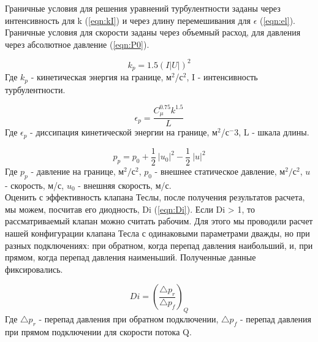 \documentclass[14pt,a4paper]{article}
\begin{document}
%        
        
        Граничные условия для решения уравнений турбулентности заданы через интенсивность для k (\ref{eqn:kI}) и через длину перемешивания для $\epsilon$ (\ref{eqn:el}). Граничные условия для скорости заданы через объемный расход, для давления через абсолютное давление (\ref{eqn:P0}).
        
        \begin{equation}\label{eqn:kI}
            k_{p} = 1.5 (I |U|)^2
        \end{equation}
        Где $k_{p}$ - кинетическая энергия на границе, м$^2$/с$^2$, I - интенсивность турбулентности.
        
        \begin{equation}\label{eqn:el}
            \epsilon_{p} = \frac{C_{\mu}^{0.75} k^{1.5}}{L}           
        \end{equation}
        Где $\epsilon_{p}$ - диссипация кинетической энергии на границе, м$^2$/с$^-3$, L - шкала длины.
        
        \begin{equation}\label{eqn:P0}
            p_{p} = p_{0} + \frac{1}{2}\ \left|u_{0}\right|^2 - \frac{1}{2}\ \left|u\right|^2
        \end{equation}
        Где $p_{p}$ - давление на границе, м$^{2}/$с$^{2}$, $p_{0}$ - внешнее статическое давление, м$^{2}/$с$^{2}$, $u$ - скорость, м/с, $u_{0}$ - внешняя скорость, м/с.\\
        
        Оценить с эффективность клапана Теслы, после получения результатов расчета, мы можем, посчитав его диодность, Di (\ref{eqn:Di}). Если Di > 1, то рассматриваемый клапан можно считать рабочим. Для этого мы проводили расчет нашей конфигурации клапана Тесла с одинаковыми параметрами дважды, но при разных подключениях: при обратном, когда перепад давления наибольший, и, при прямом, когда перепад давления наименьший. Полученные данные фиксировались.         
        
        \begin{equation}\label{eqn:Di}
            Di = (\frac{\bigtriangleup p_{r}}{\bigtriangleup p_{f}})_Q
        \end{equation}
        Где $\bigtriangleup p_{r}$ - перепад давления при обратном подключении, $\bigtriangleup p_{f}$ - перепад давления при прямом подключении для скорости потока Q.
        
\end{document}
